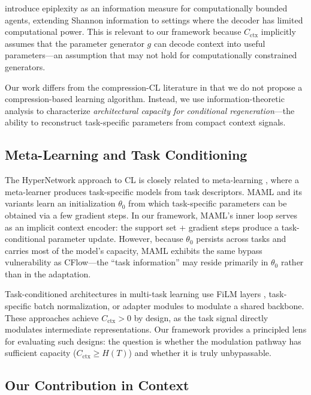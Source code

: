\documentclass{article}
\begin{document}
\citet{finzi2025epiplexity} introduce epiplexity as an information measure for computationally bounded agents, extending Shannon information to settings where the decoder has limited computational power. This is relevant to our framework because $C_\mathrm{ctx}$ implicitly assumes that the parameter generator $g$ can decode context into useful parameters---an assumption that may not hold for computationally constrained generators.

Our work differs from the compression-CL literature in that we do not propose a compression-based learning algorithm. Instead, we use information-theoretic analysis to characterize \emph{architectural capacity for conditional regeneration}---the ability to reconstruct task-specific parameters from compact context signals.

\subsection{Meta-Learning and Task Conditioning}

The HyperNetwork approach to CL is closely related to meta-learning \citep{finn2017model, hospedales2022meta}, where a meta-learner produces task-specific models from task descriptors. MAML \citep{finn2017model} and its variants learn an initialization $\theta_0$ from which task-specific parameters can be obtained via a few gradient steps. In our framework, MAML's inner loop serves as an implicit context encoder: the support set + gradient steps produce a task-conditional parameter update. However, because $\theta_0$ persists across tasks and carries most of the model's capacity, MAML exhibits the same bypass vulnerability as CFlow---the ``task information'' may reside primarily in $\theta_0$ rather than in the adaptation.

Task-conditioned architectures in multi-task learning \citep{strezoski2019many} use FiLM layers \citep{perez2018film}, task-specific batch normalization, or adapter modules to modulate a shared backbone. These approaches achieve $C_\mathrm{ctx} > 0$ by design, as the task signal directly modulates intermediate representations. Our framework provides a principled lens for evaluating such designs: the question is whether the modulation pathway has sufficient capacity ($C_\mathrm{ctx} \geq H(T)$) and whether it is truly unbypassable.

\subsection{Our Contribution in Context}
\end{document}
